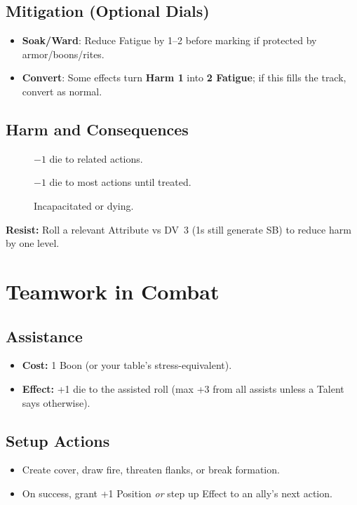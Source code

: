 \subsection*{Mitigation (Optional Dials)}
\begin{itemize}
  \item \textbf{Soak/Ward}: Reduce Fatigue by 1--2 before marking if protected by armor/boons/rites.
  \item \textbf{Convert}: Some effects turn \textbf{Harm 1} into \textbf{2 Fatigue}; if this fills the track, convert as normal.
\end{itemize}

\subsection{Harm and Consequences}
\label{sec:harm-consequences}
\begin{description}
  \item[] $-1$ die to related actions.
  \item[] $-1$ die to most actions until treated.
  \item[] Incapacitated or dying.
\end{description}
\textbf{Resist:} Roll a relevant Attribute vs DV~3 (1s still generate SB) to reduce harm by one level.

\section{Teamwork in Combat}
\label{sec:teamwork}

\subsection{Assistance}
\label{subsec:assistance}
\begin{itemize}
  \item \textbf{Cost:} 1 Boon (or your table’s stress-equivalent). 
  \item \textbf{Effect:} +1 die to the assisted roll (max +3 from all assists unless a Talent says otherwise).
\end{itemize}

\subsection{Setup Actions}
\label{subsec:setup-actions}
\begin{itemize}
  \item Create cover, draw fire, threaten flanks, or break formation.
  \item On success, grant +1 Position \emph{or} step up Effect to an ally’s next action.
\end{itemize}

